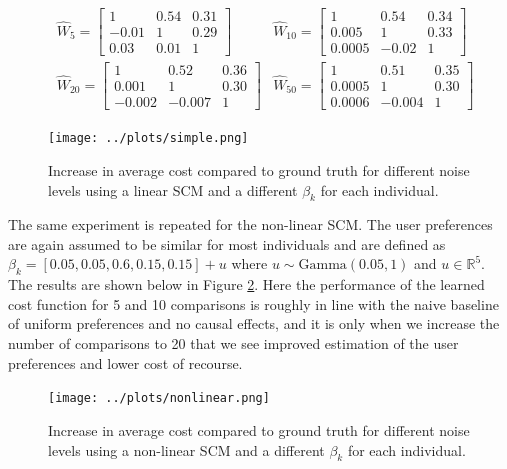 \begin{align}
	& \hat{W}_5 =
	\begin{bmatrix}
		1 & 0.54 & 0.31 \\
		-0.01 & 1 & 0.29 \\
		0.03 & 0.01 & 1
	\end{bmatrix}
	\quad
	& \hat{W}_{10} =
	\begin{bmatrix}
		1 & 0.54 & 0.34 \\
		0.005 & 1 & 0.33 \\
		0.0005 & -0.02 & 1
	\end{bmatrix} \\ \nonumber
	& \hat{W}_{20} =
	\begin{bmatrix}
		1 & 0.52 & 0.36 \\
		0.001 & 1 & 0.30 \\
		-0.002 & -0.007 & 1
	\end{bmatrix}
	& \hat{W}_{50} =
	\begin{bmatrix}
		1 & 0.51 & 0.35 \\
		0.0005 & 1 & 0.30 \\
		0.0006 & -0.004 & 1
	\end{bmatrix}
\end{align}



\begin{figure}[!htb]
	\centering
	\texttt{[image: ../plots/simple.png]}
	\caption{Increase in average cost compared to ground truth for different noise levels using a linear SCM and a different $\beta_k$ for each individual.}
	\label{fig:simple}
\end{figure}

The same experiment is repeated for the non-linear SCM. The user preferences are again assumed to be similar for most individuals and are defined as $\beta_k = [0.05, 0.05, 0.6, 0.15, 0.15] + u$ where $u \sim \text{Gamma}(0.05, 1)$ and $u \in \mathbb{R}^5$. The results are shown below in Figure \ref{fig:nonlinear}. Here the performance of the learned cost function for 5 and 10 comparisons is roughly in line with the naive baseline of uniform preferences and no causal effects, and it is only when we increase the number of comparisons to 20 that we see improved estimation of the user preferences and lower cost of recourse.


\begin{figure}[!htb]
	\centering
	\texttt{[image: ../plots/nonlinear.png]}
	\caption{Increase in average cost compared to ground truth for different noise levels using a non-linear SCM and a different $\beta_k$ for each individual.}
	\label{fig:nonlinear}
\end{figure}


